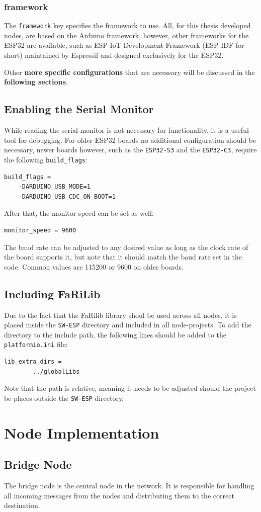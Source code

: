         \subsubsection{framework}
        The \texttt{framework} key specifies the framework to use. All, for this 
        thesis developed nodes, are based on the Arduino framework, however, other
        frameworks for the ESP32 are available, such as ESP-IoT-Development-Framework
        (ESP-IDF for short) maintained by Espressif and designed exclusively for the 
        ESP32.
        
        Other \textbf{more specific 
        configurations} that are necessary will be discussed in the \textbf{following 
        sections}.

    \subsection{Enabling the Serial Monitor}
    While reading the serial monitor is not necessary for functionality, it is a
    useful tool for debugging. For older ESP32 boards no additional configuration 
    should be necessary, newer boards however, such as the \texttt{ESP32-S3} and the 
    \texttt{ESP32-C3}, require the following \texttt{build\_flags}: 
    \begin{lstlisting}[style=cppCode]
    build_flags =
    -DARDUINO_USB_MODE=1
    -DARDUINO_USB_CDC_ON_BOOT=1
    \end{lstlisting}
    After that, the monitor speed can be set as well:
    \begin{lstlisting}[style=cppCode]
    monitor_speed = 9600
    \end{lstlisting}
    The baud rate can be adjusted to any desired value as long as the clock rate
    of the board supports it, but note that it should match the baud rate set in 
    the code. Common values are 115200 or 9600 on older boards.

    \subsection{Including FaRiLib} \label{sec:farilib_include}
    Due to the fact that the FaRilib library shoul be used across all nodes, it is
    placed inside the \texttt{SW-ESP} directory and included in all node-projects.
    To add the directory to the include path, the following lines should be added to
    the \texttt{platformio.ini} file:
    \begin{lstlisting}[style=cppCode]
    lib_extra_dirs =
        ../globalLibs
    \end{lstlisting}
    Note that the path is relative, meaning it needs to be adjusted should the project
    be places outside the \texttt{SW-ESP} directory.

\section{Node Implementation}
    \subsection{Bridge Node}
    The bridge node is the central node in the network. It is responsible for
    handling all incoming messages from the nodes and distributing them to the
    correct destination.